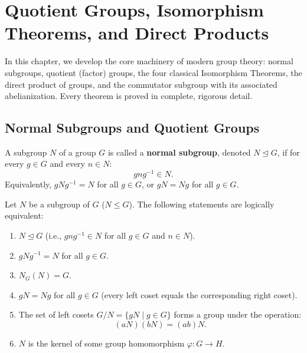 \chapter{Quotient Groups, Isomorphism Theorems, and Direct Products}
\label{chap:unit2}

In this chapter, we develop the core machinery of modern group theory: normal subgroups, quotient (factor) groups, the four classical Isomorphism Theorems, the direct product of groups, and the commutator subgroup with its associated abelianization. Every theorem is proved in complete, rigorous detail.

\section{Normal Subgroups and Quotient Groups}
\label{sec:normal_subgroups}

\begin{definition}
A subgroup $N$ of a group $G$ is called a \textbf{normal subgroup}, denoted $N \trianglelefteq G$, if for every $g \in G$ and every $n \in N$:
\begin{equation}
g n g^{-1} \in N.
\end{equation}
Equivalently, $g N g^{-1} = N$ for all $g \in G$, or $gN = Ng$ for all $g \in G$.
\end{definition}

\begin{proposition}
\label{prop:normality_criteria}
Let $N$ be a subgroup of $G$ ($N \le G$). The following statements are logically equivalent:
\begin{enumerate}[label=\textbf{(\arabic*)}, leftmargin=*, itemsep=4pt]
    \item $N \trianglelefteq G$ (i.e., $gng^{-1} \in N$ for all $g \in G$ and $n \in N$).
    \item $gNg^{-1} = N$ for all $g \in G$.
    \item $N_G(N) = G$.
    \item $gN = Ng$ for all $g \in G$ (every left coset equals the corresponding right coset).
    \item The set of left cosets $G/N = \{ gN \mid g \in G \}$ forms a group under the operation:
    \begin{equation}
    (aN)(bN) = (ab)N.
    \end{equation}
    \item $N$ is the kernel of some group homomorphism $\varphi: G \to H$.
\end{enumerate}
\end{proposition}

